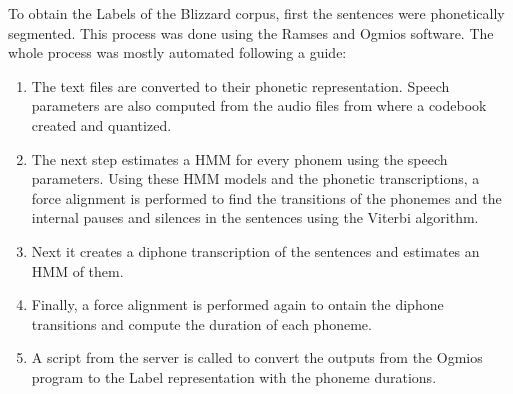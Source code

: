 
To obtain the Labels of the Blizzard corpus, first the sentences were phonetically segmented. This process was done using the Ramses and Ogmios \cite{bonafonte2006ogmios} software. The whole process was mostly automated following a guide:

\begin{enumerate}
    \item The text files are converted to their phonetic representation. Speech parameters are also computed from the audio files from where a codebook created and quantized.
    \item The next step estimates a HMM for every phonem using the speech parameters. Using these HMM models and the phonetic transcriptions, a force alignment is performed to find the transitions of the phonemes and the internal pauses and silences in the sentences using the Viterbi algorithm.
    \item Next it creates a diphone transcription \cite{marino1997demiphone} of the sentences and estimates an HMM of them.
    \item Finally, a force alignment is performed again to ontain the diphone transitions and compute the duration of each phoneme.
    \item A script from the server is called to convert the outputs from the Ogmios program to the Label representation with the phoneme durations.
\end{enumerate}

